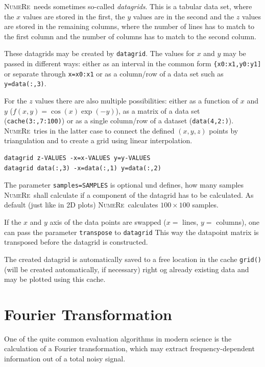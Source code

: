 \documentclass[DIV=14,headsepline,footsepline]{scrbook}
\newcommand{\NR}{\textsc{Nu\-me\-Re}}
\begin{document}
				\NR\ needs sometimes so-called \emph{datagrids}. This is a tabular data set, where the $x$ values are stored in the first, the $y$ values are in the second and the $z$ values are stored in the remaining columns, where the number of lines has to match to the first column and the number of columns has to match to the second column.
				
				These datagrids may be created by \lstinline+datagrid+. The values for $x$ and $y$ may be passed in different ways: either as an interval in the common form \lstinline+{x0:x1,y0:y1]+ or separate through \lstinline+x=x0:x1+ or as a column/row of a data set such as \lstinline+y=data(:,3)+.
				
				For the $z$ values there are also multiple possibilities: either as a function of $x$ and $y$ ($f(x,y) = \cos(x)\exp(-y)$), as a matrix of a data set (\lstinline+cache(3:,7:100)+) or as a single column/row of a dataset (\lstinline+data(4,2:)+). \NR\ tries in the latter case to connect the defined $(x,y,z)$ points by triangulation and to create a grid using linear interpolation.
				\begin{lstlisting}
datagrid z-VALUES -x=x-VALUES y=y-VALUES
datagrid data(:,3) -x=data(:,1) y=data(:,2)
				\end{lstlisting}
				
				The parameter \lstinline+samples=SAMPLES+ is optional und defines, how many samples \NR\ shall calculate if a component of the datagrid has to be calculated. As default (just like in 2D plots) \NR\ calculates $100\times100$ samples.
				
				If the $x$ and $y$ axis of the data points are swapped ($x =$ lines, $y=$ columns), one can pass the parameter \lstinline+transpose+ to \lstinline+datagrid+ This way the datapoint matrix is transposed before the datagrid is constructed.
	
				The created datagrid is automatically saved to a free location in the cache \lstinline+grid()+ (will be created automatically, if necessary) right og already existing data and may be plotted using this cache.
				
			\section{Fourier Transformation}
				One of the quite common evaluation algorithms in modern science is the calculation of a Fourier transformation, which may extract frequency-dependent information out of a total noisy signal.
				
\end{document}
